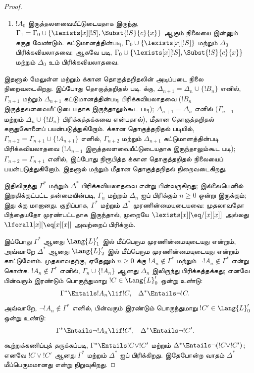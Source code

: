 \documentclass[../../../include/open-logic-section]{subfiles}
\begin{document}
\begin{proof}
\begin{enumerate}
  $\Gamma_1$ மற்றும் $\Delta_0$ பிரிக்கவியலாதவை.
\item $!A_0$ இருத்தலளவையீட்டுடையதாக இருந்து,
  $\Gamma_1 = \Gamma_0 \cup \{ \lexists[x][!S], \Subst{!S}{c}{x}
  \}$ ஆகும் நிலையை இன்னும் கருத வேண்டும். கட்டுமானத்தின்படி,
  $\Gamma_0 \cup \{ \lexists[x][!S]\}$ மற்றும் $\Delta_0$
  பிரிக்கவியலாதவை; ஆகவே  படி,
  $\Gamma_0 \cup \{ \lexists[x][!S], \Subst{!S}{c}{x} \}$ மற்றும்
  $\Delta_0$ உம் பிரிக்கவியலாதவை.
\end{enumerate}
இதனால் மேலுள்ள  மற்றும்  க்கான
தொகுத்தறிதலின் அடிப்படை நிலை நிறைவடைகிறது. இப்போது தொகுத்தறிதல் படி.
 க்கு, $\Delta_{n+1} = \Delta_n \cup \{ !B_n \}$
எனில், $\Gamma_{n+1}$ மற்றும் $\Delta_{n+1}$ கட்டுமானத்தின்படி
பிரிக்கவியலாதவை ($!B_n$ இருத்தலளவையீட்டுடையதாக இருந்தாலும்கூட
 படி); $\Delta_{n+1} = \Delta_n$ எனில்
($\Gamma_{n+1}$ மற்றும் $\Delta_n \cup \{!B_n\}$ பிரிக்கத்தக்கவை
என்பதால்),  மீதான தொகுத்தறிதல் கருதுகோளைப்
பயன்படுத்துகிறோம்.  க்கான தொகுத்தறிதல் படியில்,
$\Gamma_{n+2} = \Gamma_{n+1} \cup
\{!A_{n+1} \}$ எனில், $\Gamma_{n+2}$ மற்றும் $\Delta_{n+1}$
கட்டுமானத்தின்படி பிரிக்கவியலாதவை ($!A_{n+1}$
இருத்தலளவையீட்டுடையதாக இருந்தாலும்கூட  படி);
$\Gamma_{n+2} = \Gamma_{n+1}$ எனில், இப்போது நிரூபித்த
 க்கான தொகுத்தறிதல் நிலையைப் பயன்படுத்துகிறோம்.
இதனால்  மற்றும்  மீதான தொகுத்தறிதல்
நிறைவடைகிறது.

இதிலிருந்து $\Gamma^*$ மற்றும் $\Delta^*$ பிரிக்கவியலாதவை என்று
பின்வருகிறது; இல்லையெனில் இறுதிக்குட்பட்ட தன்மையின்படி,
$\Gamma_n$ மற்றும் $\Delta_n$ ஐப் பிரிக்கும் $n \ge 0$ ஒன்று
இருக்கும்; இது  க்கு மாறானது. குறிப்பாக,
$\Gamma^*$ மற்றும் $\Delta^*$ முரணின்மையுடையவை: முதலாவதோ
பிந்தையதோ முரண்பட்டதாக இருந்தால், முறையே
$\lexists[x][\eq/[x][x]]$ அல்லது
$\lforall[x][\eq[x][x]]$ அவற்றைப் பிரிக்கும்.

இப்போது $\Gamma^*$ ஆனது $\Lang{L}'_1$ இல் மீப்பெரும
முரணின்மையுடையது என்றும், அவ்வாறே $\Delta^*$ ஆனது
$\Lang{L}'_2$ இல் மீப்பெரும முரணின்மையுடையது என்றும் காட்டுவோம்.
முதலாவதற்கு, ஏதேனும் $n \ge 0$ க்கு $!A_n \notin \Gamma^*$ மற்றும்
$\lnot !A_n
\notin \Gamma^*$ என்று கொள்க. $!A_n \notin \Gamma^*$ எனில்,
$\Gamma_n \cup \{!A_n \}$ ஆனது $\Delta_n$ இலிருந்து பிரிக்கத்தக்கது;
எனவே பின்வரும் இரண்டும் பொருந்துமாறு $!C \in \Lang{L}'_0$ ஒன்று உண்டு:
\begin{align*}
  \Gamma^* & \Entails !A_n \lif !C, &
  \Delta^* & \Entails \lnot !C.
\end{align*}
அவ்வாறே, $\lnot !A_n \notin \Gamma^*$ எனில், பின்வரும் இரண்டும்
பொருந்துமாறு $!C' \in
\Lang{L}'_0$ ஒன்று உண்டு:
\begin{align*}
  \Gamma^* & \Entails \lnot !A_n \lif !C', &
  \Delta^* & \Entails \lnot !C'.
\end{align*}
கூற்றுக்கணிப்புத் தருக்கப்படி, $\Gamma^* \Entails !C \lor !C'$ மற்றும்
$\Delta^* \Entails \lnot (!C \lor !C')$; எனவே $!C \lor
!C'$ ஆனது $\Gamma^*$ மற்றும் $\Delta^*$ ஐப் பிரிக்கிறது.
இதேபோன்ற வாதம் $\Delta^*$ மீப்பெருமமானது என்று நிறுவுகிறது.


\end{proof}
\end{document}
